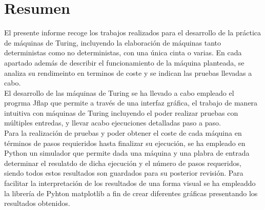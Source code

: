 \part{Resumen}

El presente informe recoge los trabajos realizados para el desarrollo de la práctica de máquinas de Turing, incluyendo la elaboración de máquinas tanto deterministas como no deterministas, con una única cinta o varias. En cada apartado además de describir el funcionamiento de la máquina planteada, se analiza su rendimeinto en terminos de coste y se indican las pruebas llevadas a cabo.\\

El desarrollo de las máquinas de Turing se ha llevado a cabo empleado el progrma Jflap que permite a través de una interfaz gráfica, el trabajo de manera intuitiva con máquinas de Turing incluyendo el poder realizar pruebas con múltiples entredas, y llevar acabo ejecuciones detalladas paso a paso.\\

Para la realización de pruebas y poder obtener el coste de cada máquina en términos de pasos requieridos hasta finalizar su ejecución, se ha empleado en Python un simulador que permite dada una máquina y una plabra de entrada determinar el resulatdo de dicha ejecución y el número de pasos requeridos, siendo todos estos resultados son guardados para su posterior revisión. Para facilitar la interpretación de los resultados de una forma visual se ha empleaddo la librería de Pyhton matplotlib a fin de crear diferentes gráficas presentando los resultados obtenidos.\\

\newpage
